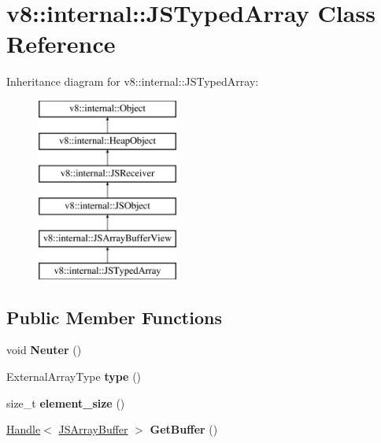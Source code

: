 \hypertarget{classv8_1_1internal_1_1_j_s_typed_array}{}\section{v8\+:\+:internal\+:\+:J\+S\+Typed\+Array Class Reference}
\label{classv8_1_1internal_1_1_j_s_typed_array}
Inheritance diagram for v8\+:\+:internal\+:\+:J\+S\+Typed\+Array\+:\begin{figure}[H]
\begin{center}
\leavevmode
\includegraphics[height=6.000000cm]{classv8_1_1internal_1_1_j_s_typed_array}
\end{center}
\end{figure}
\subsection*{Public Member Functions}
\begin{DoxyCompactItemize}
\item 
\hypertarget{classv8_1_1internal_1_1_j_s_typed_array_a33e2f3d896830d6427d180bbebffd57a}{}void {\bfseries Neuter} ()\label{classv8_1_1internal_1_1_j_s_typed_array_a33e2f3d896830d6427d180bbebffd57a}

\item 
\hypertarget{classv8_1_1internal_1_1_j_s_typed_array_afde5c223fea09a38b96115093437b3c8}{}External\+Array\+Type {\bfseries type} ()\label{classv8_1_1internal_1_1_j_s_typed_array_afde5c223fea09a38b96115093437b3c8}

\item 
\hypertarget{classv8_1_1internal_1_1_j_s_typed_array_aac811bca8603d48ef4ea6366abebcaa6}{}size\+\_\+t {\bfseries element\+\_\+size} ()\label{classv8_1_1internal_1_1_j_s_typed_array_aac811bca8603d48ef4ea6366abebcaa6}

\item 
\hypertarget{classv8_1_1internal_1_1_j_s_typed_array_a652f569a7f5248ef5990faa5682124d1}{}\hyperlink{classv8_1_1internal_1_1_handle}{Handle}$<$ \hyperlink{classv8_1_1internal_1_1_j_s_array_buffer}{J\+S\+Array\+Buffer} $>$ {\bfseries Get\+Buffer} ()\label{classv8_1_1internal_1_1_j_s_typed_array_a652f569a7f5248ef5990faa5682124d1}

\end{DoxyCompactItemize}
